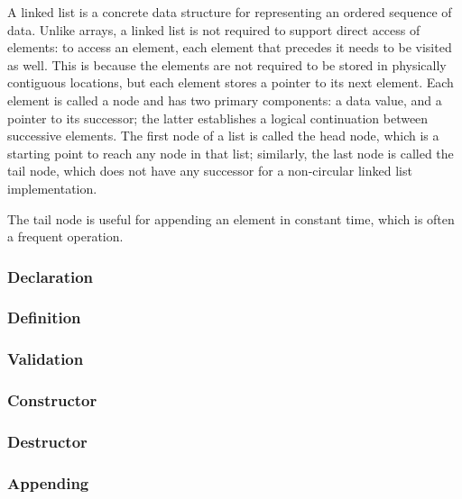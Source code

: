 \def\Subsubsection#1{\subsubsection{#1}
}

A linked list is a concrete data structure
for representing an ordered sequence of data.
Unlike arrays, a linked list is not required to support direct access of elements:
to access an element, each element that precedes it needs to be visited as well.
This is because the elements are not required to be stored in physically
contiguous locations, but each element stores a pointer to its next element.
Each element is called a node and has two primary components:
a data value, and a pointer to its successor; the latter
establishes a logical continuation between successive elements.
The first node of a list is called the head node, which is a starting point to
reach any node in that list; similarly, the last node is called the tail node,
which does not have any successor for a non-circular linked list implementation.

\note The tail node is useful for appending an element
in constant time, which is often a frequent operation.

\Subsubsection{Declaration}

\enlargethispage*{\baselineskip}
\enlargethispage*{\baselineskip}
\Subsubsection{Definition}
\pagebreak

\Subsubsection{Validation}

\Subsubsection{Constructor}

\Subsubsection{Destructor}

\Subsubsection{Appending}
